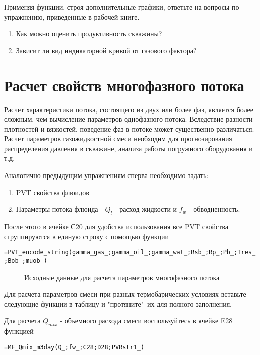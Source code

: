 Применяя функции, строя дополнительные графики, ответьте на вопросы по упражнению, приведенные в рабочей книге.

	\begin{enumerate}
		\item Как можно оценить продуктивность скважины?
		\item Зависит ли вид индикаторной кривой от газового фактора?
	\end{enumerate}



\section{Расчет свойств многофазного потока}

Расчет характеристики потока, состоящего из двух или более фаз, является более сложным, чем вычисление параметров однофазного потока. Вследствие разности плотностей и вязкостей, поведение фаз в потоке может существенно различаться. Расчет параметров газожидкостной смеси необходим для прогнозирования распределения давления в скважине, анализа работы погружного оборудования и т.д.
 
Аналогично предыдущим упражнениям сперва необходимо задать:
	\begin{enumerate}
		\item PVT свойства флюидов
		\item Параметры потока флюида - $Q_{l}$ - расход жидкости и $f_{w}$ - обводненность.
	\end{enumerate}
После этого в ячейке С20 для удобства использования все PVT свойства сгруппируются в единую строку с помощью функции

{ \small  \texttt{=PVT\_encode\_string(gamma\_gas\_;gamma\_oil\_;gamma\_wat\_;Rsb\_;Rp\_;Pb\_;Tres\_;Bob\_;muob\_)}}

\begin{figure}[h!]
	\center{\texttt{[image: Ex30\_1]}}
	\caption{Исходные данные для расчета параметров многофазного потока}
	\label{ris:Ex30_1}
\end{figure}

Для расчета параметров смеси при разных термобарических условиях вставьте следующие функции в таблицу и "протяните"\ их для полного заполнения.

Для расчета $Q_{mix}$ - объемного расхода смеси воспользуйтесь в ячейке E28 функцией

{ \small  \texttt{=MF\_Qmix\_m3day(Q\_;fw\_;C28;D28;PVRstr1\_)}}

